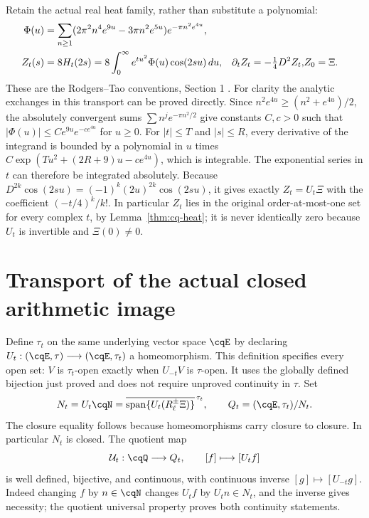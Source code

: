 Retain the actual real heat family, rather than substitute a polynomial:
\begin{align}\label{eq:cq-realheat}
 \Phi(u)&=\sum_{n\geq1}
 (2\pi^2n^4e^{9u}-3\pi n^2e^{5u})e^{-\pi n^2e^{4u}},\notag\\
 Z_t(s)&=8H_t(2s)=8\int_0^\infty e^{tu^2}\Phi(u)\cos(2su)\,du,
 &\partial_tZ_t=-\tfrac14D^2Z_t,
 &Z_0=\Xi.
\end{align}
These are the Rodgers--Tao conventions, Section 1 \cite{cqRT}.
For clarity the analytic exchanges in this transport can be proved
directly. Since $n^2e^{4u}\geq(n^2+e^{4u})/2$, the absolutely
convergent sums $\sum n^je^{-\pi n^2/2}$ give constants $C,c>0$
such that $|\Phi(u)|\leq Ce^{9u}e^{-ce^{4u}}$ for $u\geq0$.
For $|t|\leq T$ and $|s|\leq R$, every derivative of the integrand
is bounded by a polynomial in $u$ times
$C\exp(Tu^2+(2R+9)u-ce^{4u})$, which is integrable.
The exponential series in $t$ can therefore be integrated absolutely.
Because $D^{2k}\cos(2su)=(-1)^k(2u)^{2k}\cos(2su)$, it gives
exactly $Z_t=U_t\Xi$ with the coefficient $(-t/4)^k/k!$.
In particular $Z_t$ lies in the original order-at-most-one set for
every complex $t$, by Lemma~\ref{thm:cq-heat}; it is never identically
zero because $U_t$ is invertible and $\Xi(0)\ne0$.

\section{Transport of the actual closed arithmetic image}
\label{sec:cq-moving}
Define $\tau_t$ on the same underlying vector space $\cqE$ by
declaring $U_t:(\cqE,\tau)\longrightarrow(\cqE,\tau_t)$ a
homeomorphism. This definition specifies every open set:
$V$ is $\tau_t$-open exactly when $U_{-t}V$ is $\tau$-open.
It uses the globally defined bijection just proved and does not require
unproved continuity in $\tau$. Set
\begin{equation}\label{eq:cq-Qt}
 N_t=U_t\cqN
 =\overline{\operatorname{span}\{U_t(R_\ell^\pm\Xi)\}}^{\,\tau_t},
 \qquad Q_t=(\cqE,\tau_t)/N_t.
\end{equation}
The closure equality follows because homeomorphisms carry closure to
closure. In particular $N_t$ is closed. The quotient map
\begin{equation}\label{eq:cq-Phi}
 \mathcal U_t:\cqQ\longrightarrow Q_t,\qquad [f]\longmapsto[U_tf]
\end{equation}
is well defined, bijective, and continuous, with continuous inverse
$[g]\mapsto[U_{-t}g]$. Indeed changing $f$ by $n\in\cqN$
changes $U_tf$ by $U_tn\in N_t$, and the inverse gives necessity;
the quotient universal property proves both continuity statements.

